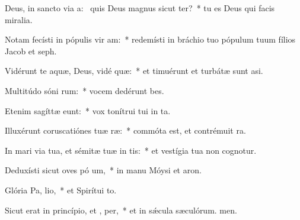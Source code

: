 \item Deus, in sancto via a:~\pscross{} quis Deus magnus sicut  ter?~* tu es Deus qui facis miralia.
\item Notam fecísti in pópulis vir am:~* redemísti in bráchio tuo pópulum tuum fílios Jacob et seph.
\item Vidérunt te aquæ, Deus, vidé  quæ:~* et timuérunt et turbátæ sunt asi.
\item Multitúdo sóni rum:~* vocem dedérunt bes.
\item Etenim sagíttæ  eunt:~* vox tonítrui tui in ta.
\item Illuxérunt coruscatiónes tuæ  ræ:~* commóta est, et contrémuit ra.
\item In mari via tua, et sémitæ tuæ in  tis:~* et vestígia tua non cognotur.
\item Deduxísti sicut oves pó um,~* in manu Móysi et aron.
\item Glória Pa,  lio,~* et Spirítui to.
\item Sicut erat in princípio, et ,  per,~* et in sǽcula sæculórum. men.
